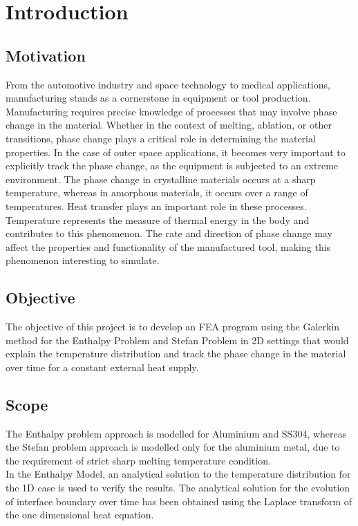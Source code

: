 \chapter{Introduction\label{cha:chapter1}}

\section{Motivation\label{sec:moti}}

From the automotive industry and space technology to medical applications, manufacturing stands as a cornerstone in equipment or tool production. Manufacturing requires precise knowledge of processes that may involve phase change in the material. Whether in the context of melting, ablation, or other transitions, phase change plays a critical role in determining the material properties. In the case of outer space applications, it becomes very important to explicitly track the phase change, as the equipment is subjected to an extreme environment. The phase change in crystalline materials occurs at a sharp temperature, whereas in amorphous materials, it occurs over a range of temperatures. Heat transfer plays an important role in these processes. Temperature represents the measure of thermal energy in the body and contributes to this phenomenon. The rate and direction of phase change may affect the properties and functionality of the manufactured tool, making this phenomenon interesting to simulate.

\section{Objective\label{sec:objective}}

The objective of this project is to develop an FEA program using the Galerkin method\cite{galerkin1915series} for the Enthalpy Problem\cite{verhoeven2003modelling} and Stefan Problem\cite{stefan1891theorie}\cite{verhoeven2003modelling} in 2D settings that would explain the temperature distribution and track the phase change in the material over time for a constant external heat supply.

\section{Scope\label{sec:scope}}

The Enthalpy problem approach is modelled for Aluminium and SS304, whereas the Stefan problem approach is modelled only for the aluminium metal, due to the requirement of strict sharp melting temperature condition.\\
In the Enthalpy Model\cite{verhoeven2003modelling}, an analytical solution\cite{debnath2010nonlinear} to the temperature distribution for the 1D case is used to verify the results. The analytical solution for the evolution of interface boundary over time has been obtained using the Laplace transform of the one dimensional heat equation\cite{verhoeven2003modelling}.\\





